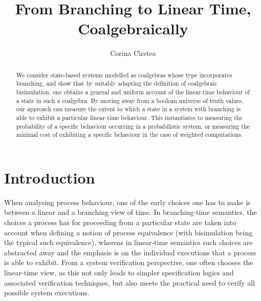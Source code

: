 \documentclass[submission,copyright,creativecommons]{eptcs}
\title{From Branching to Linear Time, Coalgebraically}
\author{Corina C\^{\i}rstea
\institute{University of Southampton}
\email{cc2@ecs.soton.ac.uk}}
\theoremstyle{plain}\newtheorem{theorem}{Theorem}[section]
\theoremstyle{remark}
\begin{document}
\maketitle
\begin{abstract}
We consider state-based systems modelled as coalgebras whose type incorporates branching, and show that by suitably adapting the definition of coalgebraic bisimulation, one obtains a general and uniform account of the linear-time behaviour of a state in such a coalgebra. By moving away from a boolean universe of truth values, our approach can measure the extent to which a state in a system with branching is able to exhibit a particular linear-time behaviour. This instantiates to measuring the probability of a specific behaviour occurring in a probabilistic system, or measuring the minimal cost of exhibiting a specific behaviour in the case of weighted computations.
\end{abstract}

\section{Introduction}
\label{1}

When analysing process behaviour, one of the early choices one has to make is between a linear and a branching view of time. In branching-time semantics, the choices a process has for proceeding from a particular state are taken into account when defining a notion of process equivalence (with bisimulation being the typical such equivalence), whereas in linear-time semantics such choices are abstracted away and the emphasis is on the individual executions that a process is able to exhibit. From a system verification perspective, one often chooses the linear-time view, as this not only leads to simpler specification logics and associated verification techniques, but also meets the practical need to verify all possible system executions.
\end{document}
